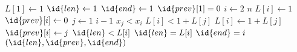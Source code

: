 \begin{codebox}
\li $L[1] \gets 1$
\li $\id{len} \gets 1$
\li $\id{end} \gets 1$
\li $\id{prev}[1] = 0$
\li \For $i \gets 2$ \To $n$
\li \Do
		$L[i] \gets 1$
\li		$\id{prev}[i] \gets 0$
\li		\For $j \gets 1$ \To $i-1$
\li		\Do
			\If $x_j < x_i$
\li			\Then
				\If $L[i] < 1 + L[j]$
\li				\Then
					$L[i] \gets 1 + L[j]$
\li					$\id{prev}[i] \gets j$
				\End
			\End
		\End
\li		\If $\id{len} < L[i]$
\li		\Then
			$\id{len} = L[i]$
\li			$\id{end} = i$
		\End
	\End
\li \Return $(\id{len}, \id{prev}, \id{end})$
\end{codebox}